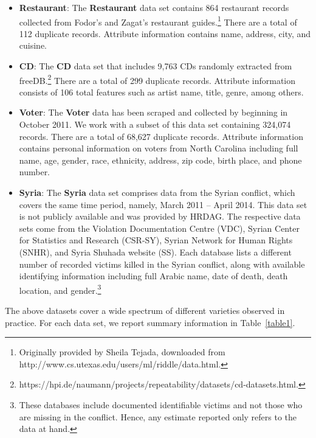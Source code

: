 \documentclass{imsart}
\begin{document}
\begin{itemize}
    \item \textbf{Restaurant}: The \textbf{Restaurant} data set contains 864 restaurant records collected from Fodor's and Zagat's restaurant guides.\footnote{Originally provided by Sheila Tejada, downloaded from http://www.cs.utexas.edu/users/ml/riddle/data.html.}  There are a total of 112 duplicate records. Attribute information contains name, address, city, and cuisine.

        \item \textbf{CD}: The \textbf{CD} data set that includes 9,763 CDs randomly extracted from freeDB.\footnote{https://hpi.de/naumann/projects/repeatability/datasets/cd-datasets.html.} There are a total of 299 duplicate records. Attribute information consists of 106 total features such as artist name, title, genre, among others.

    \item \textbf{Voter}: The  \textbf{Voter} data has been scraped and collected by \cite{christen14voter} beginning in October 2011. We work with a subset of this data set containing 324,074 records. There are a total of 68,627 duplicate records. Attribute information contains personal information on voters from North Carolina including full name, age, gender, race, ethnicity, address, zip code, birth place, and phone number.

    \item \textbf{Syria}: The \textbf{Syria} data set comprises data from the Syrian conflict, which covers the same time period, namely, March 2011 -- April 2014. This data set is not publicly available and was provided by HRDAG. The respective data sets come from the Violation Documentation Centre (VDC), Syrian Center for Statistics and Research (CSR-SY), Syrian Network for Human Rights (SNHR), and Syria Shuhada website (SS). Each database lists a different number of recorded victims killed in the Syrian conflict, along with available identifying information including full Arabic name, date of death, death location, and gender.\footnote{These databases include documented identifiable victims and not those who are missing in the conflict. Hence, any estimate reported only refers to the data at hand.}
\end{itemize}

The above datasets cover a wide spectrum of different varieties observed in practice. For each data set, we report summary information in
Table~\ref{table1}.
\end{document}
